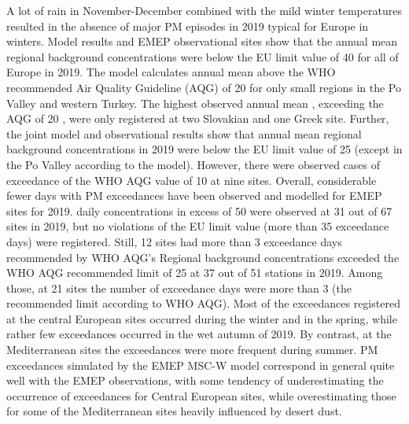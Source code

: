 A lot of rain in November-December combined with the mild winter temperatures resulted in the absence of major PM episodes in 2019 typical for Europe in winters. Model results and EMEP observational sites show that the annual mean regional background \PM[10] concentrations were below the EU limit value of 40 \ug for all of Europe in 2019. The model calculates annual mean \PM[10] above the WHO recommended Air Quality Guideline (AQG) of 20 \ug for only small regions in the Po Valley and western Turkey. The highest observed annual mean \PM[10], exceeding the AQG of 20 \ug, were only registered at two Slovakian and one Greek site. Further, the joint model and observational results show that annual mean regional background \PM[2.5] concentrations in 2019 were below the EU limit value of 25 \ug (except in the Po Valley according to the model). However, there were observed cases of exceedance of the WHO AQG value of 10 \ug at nine sites.
Overall, considerable fewer days with PM exceedances have been observed and modelled for EMEP sites for 2019. \PM[10] daily concentrations in excess of 50 \ug were observed at 31 out of 67 sites in 2019, but no violations of the \PM[10] EU limit value (more than 35 exceedance days) were registered. Still, 12 sites had more than 3 exceedance days recommended by WHO AQG’s %
Regional background \PM[2.5] concentrations exceeded the WHO AQG recommended limit of 25 \ug at 37 out of 51 stations in 2019. Among those, at 21 sites the number of exceedance days were more than 3 (the recommended limit according to WHO AQG).  %
Most of the exceedances registered at the central European sites occurred during the winter and in the spring, while rather few exceedances occurred in the wet autumn of 2019. By contrast, at the Mediterranean sites the exceedances were more frequent during summer. PM exceedances simulated by the EMEP MSC-W model correspond in general quite well with the EMEP observations, with some tendency of underestimating the occurrence of exceedances for Central European sites, while overestimating those for some of the Mediterranean sites heavily influenced by desert dust.



